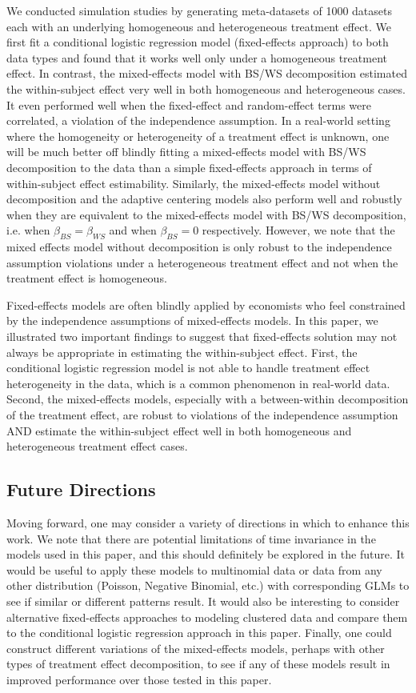 \documentclass{article}
\begin{document}
     We conducted simulation studies by generating meta-datasets of 1000 datasets each with an underlying homogeneous and heterogeneous treatment effect. We first fit a conditional logistic regression model (fixed-effects approach) to both data types and found that it works well only under a homogeneous treatment effect. In contrast, the mixed-effects model with BS/WS decomposition estimated the within-subject effect very well in both homogeneous and heterogeneous cases. It even performed well when the fixed-effect and random-effect terms were correlated, a violation of the independence assumption. In a real-world setting where the homogeneity or heterogeneity of a treatment effect is unknown, one will be much better off blindly fitting a mixed-effects model with BS/WS decomposition to the data than a simple fixed-effects approach in terms of within-subject effect estimability. Similarly, the mixed-effects model without decomposition and the adaptive centering models also perform well and robustly when they are equivalent to the mixed-effects model with BS/WS decomposition, i.e. when $\beta_{BS} = \beta_{WS}$ and when $\beta_{BS} = 0$ respectively. However, we note that the mixed effects model without decomposition is only robust to the independence assumption violations under a heterogeneous treatment effect and not when the treatment effect is homogeneous.

     Fixed-effects models are often blindly applied by economists who feel constrained by the independence assumptions of mixed-effects models. In this paper, we illustrated two important findings to suggest that fixed-effects solution may not always be appropriate in estimating the within-subject effect. First, the conditional logistic regression model is not able to handle treatment effect heterogeneity in the data, which is a common phenomenon in real-world data. Second, the mixed-effects models, especially with a between-within decomposition of the treatment effect, are robust to violations of the independence assumption AND estimate the within-subject effect well in both homogeneous and heterogeneous treatment effect cases.
    
    \subsection{Future Directions}
    Moving forward, one may consider a variety of directions in which to enhance this work. We note that there are potential limitations of time invariance in the models used in this paper, and this should definitely be explored in the future. It would be useful to apply these models to multinomial data or data from any other distribution (Poisson, Negative Binomial, etc.) with corresponding GLMs to see if similar or different patterns result. It would also be interesting to consider alternative fixed-effects approaches to modeling clustered data and compare them to the conditional logistic regression approach in this paper. Finally, one could construct different variations of the mixed-effects models, perhaps with other types of treatment effect decomposition, to see if any of these models result in improved performance over those tested in this paper. 
 
\end{document}
